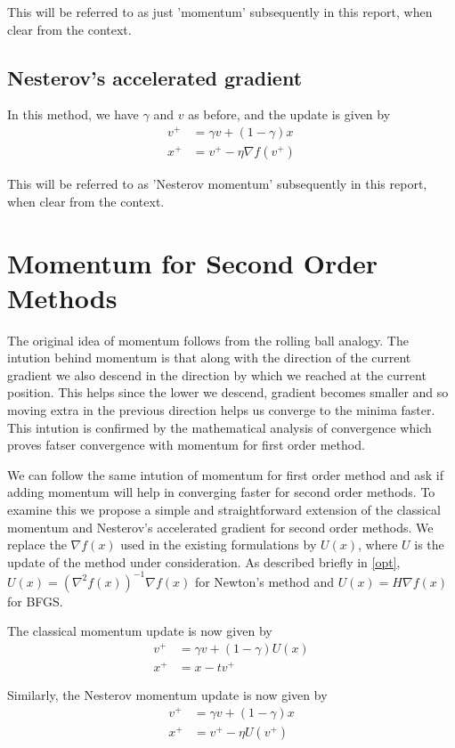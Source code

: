 \documentclass{article}
\begin{document}
This will be referred to as just 'momentum' subsequently in this report, when clear from the context.

\subsection{Nesterov's accelerated gradient}
In this method, we have $\gamma$ and $v$ as before, and the update is given by
\begin{align}
v^+ &= \gamma v + (1-\gamma)x \\
x^+ &= v^+ - \eta \nabla f(v^+)
\end{align}

This will be referred to as 'Nesterov momentum' subsequently in this report, when clear from the context.


\section{Momentum for Second Order Methods}\label{methodology}

The original idea of momentum follows from the rolling ball analogy. The intution behind momentum is that along with the direction of the current gradient we also descend in the direction by which we reached at the current position. This helps since the lower we descend, gradient becomes smaller and  so moving extra in the previous direction helps us converge to the minima faster. This intution is confirmed by the mathematical analysis of convergence which proves fatser convergence with momentum for first order method. 

We can follow the same intution of momentum for first order method and ask if adding momentum will help in converging faster for second order methods. To examine this we propose a simple and straightforward extension of the classical momentum and Nesterov's accelerated gradient for second order methods. We replace the $\nabla f(x)$ used in the existing formulations by $U(x)$, where $U$ is the update of the method under consideration. As described briefly in \ref{opt}, $U(x)=\left(\nabla^2 f(x) \right)^{-1}\nabla f(x)$ for Newton's method and $U(x)=H \nabla f(x)$ for BFGS.

The classical momentum update is now given by
\begin{align*}
v^{+} &= \gamma v + (1-\gamma) U(x) \\
x^{+} &= x - tv^{+}
\end{align*}

Similarly, the Nesterov momentum update is now given by
\begin{align}
v^+ &= \gamma v + (1-\gamma)x \\
x^+ &= v^+ - \eta U(v^+)
\end{align}
\end{document}

